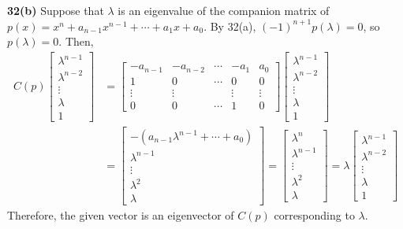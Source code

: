 \textbf{32(b)} Suppose that $\lambda$ is an eigenvalue of the companion matrix of $p(x) = x^n + a_{n-1}x^{n-1} + \cdots + a_1x + a_0$. By 32(a), $(-1)^{n+1}p(\lambda) = 0$, so $p(\lambda) = 0$. Then, \begin{align*}
	C(p)\begin{bmatrix}
		\lambda^{n-1} \\ \lambda^{n-2} \\ \vdots \\ \lambda \\ 1
	\end{bmatrix} &= \begin{bmatrix}
		-a_{n-1} & -a_{n-2} & \cdots & -a_1 & a_0 \\
		1    & 0        & \cdots & 0    & 0   \\
		\vdots & \vdots &        & \vdots & \vdots \\
		0    & 0        & \cdots & 1      & 0
	\end{bmatrix}\begin{bmatrix}
	\lambda^{n-1} \\ \lambda^{n-2} \\ \vdots \\ \lambda \\ 1
	\end{bmatrix} \\
	&= \begin{bmatrix}
		-(a_{n-1}\lambda^{n-1} + \cdots + a_0) \\ \lambda^{n-1} \\ \vdots \\ \lambda^2 \\ \lambda
	\end{bmatrix}
	= \begin{bmatrix}
		\lambda^n \\ \lambda^{n-1} \\ \vdots \\ \lambda^2 \\ \lambda
	\end{bmatrix} = \lambda\begin{bmatrix}
		\lambda^{n-1} \\ \lambda^{n-2} \\ \vdots \\ \lambda \\ 1
	\end{bmatrix}
\end{align*} Therefore, the given vector is an eigenvector of $C(p)$ corresponding to $\lambda$. \\

